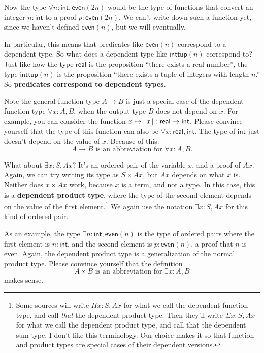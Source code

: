 \documentclass[11pt,paper=letter]{scrartcl}
\renewcommand{\sf}{\mathsf}
\begin{document}
Now the type $\forall n: \sf{int}, \sf{even}(2n)$ would be the type of functions that convert an integer $n : \sf{int}$ to a proof $p : \sf{even}(2n)$. We can't write down such a function yet, since we haven't defined $\sf{even}(n)$, but we will eventually.

In particular, this means that predicates like $\sf{even}(n)$ correspond to a dependent type. So what does a dependent type like $\sf{inttup}(n)$ correspond to? Just like how the type $\sf{real}$ is the proposition ``there exists a real number'', the type $\sf{inttup}(n)$ is the proposition ``there exists a tuple of integers with length $n$.'' So \textbf{predicates correspond to dependent types}.

Note the general function type $A \to B$ is just a special case of the dependent function type $\forall x: A, B$, when the output type $B$ does not depend on $x$. For example, you can consider the function $x \mapsto \floor{x} : \sf{real} \to \sf{int}$. Please convince yourself that the type of this function can also be $\forall x: \sf{real}, \sf{int}$. The type of $\sf{int}$ just doesn't depend on the value of $x$. Because of this: \[
  A \to B \text{ is an abbreviation for } \forall x: A, B.
\]

What about $\exists x: S, Ax$? It's an ordered pair of the variable $x$, and a proof of $Ax$. Again, we can try writing its type as $S \times Ax$, but $Ax$ depends on what $x$ is. Neither does $x \times Ax$ work, because $x$ is a term, and not a type. In this case, this is a \textbf{dependent product type}, where the type of the second element depends on the value of the first element.\footnote{Some sources will write $\Pi x: S, Ax$ for what we call the dependent function type, and call \emph{that} the dependent product type. Then they'll write $\Sigma x: S, Ax$ for what we call the dependent product type, and call that the dependent sum type. I don't like this terminology. Our choice makes it so that function and product types are special cases of their dependent versions.} We again use the notation $\exists x : S, Ax$ for this kind of ordered pair.

As an example, the type $\exists n: \sf{int}, \sf{even}(n)$ is the type of ordered pairs where the first element is $n : \sf{int}$, and the second element is $p : \sf{even}(n)$, a proof that $n$ is even. Again, the dependent product type is a generalization of the normal product type. Please convince yourself that the definition \[
  A \times B \text{ is an abbreviation for } \exists x: A, B
\]
makes sense.
\end{document}
